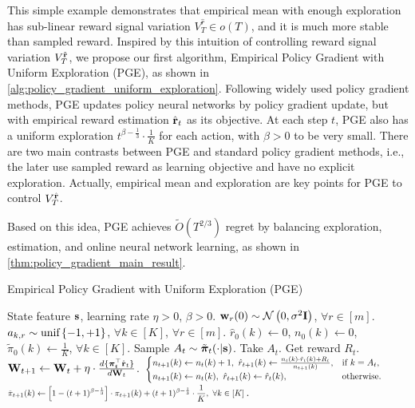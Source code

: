 This simple example demonstrates that empirical mean with enough exploration has sub-linear reward signal variation $V_T^{\hat{r}} \in o(T)$, and it is  much more stable than sampled reward. Inspired by this intuition of controlling reward signal variation $V_T^{\tilde{{\mathbf{r}}}}$, we propose our first algorithm, Empirical Policy Gradient with Uniform Exploration (PGE), as shown in \cref{alg:policy_gradient_uniform_exploration}. Following widely used policy gradient methods, PGE updates policy neural networks by policy gradient update, but with empirical reward estimation $\hat{{\mathbf{r}}}_t$ as its objective. At each step $t$, PGE also has a uniform exploration $t^{ \beta - \frac{1}{3}} \cdot \frac{1}{K}$ for each action, with $\beta > 0$ to be very small. There are two main contrasts between PGE and standard policy gradient methods, i.e., the later use sampled reward as learning objective and have no explicit exploration. Actually, empirical mean and exploration are key points for PGE to control $V_T^{\hat{{\mathbf{r}}}}$. 
 
Based on this idea, PGE achieves $\tilde{O}(T^{2/3})$ regret by balancing exploration, estimation, and online neural network learning, as shown in \cref{thm:policy_gradient_main_result}.

\begin{algorithm}[t]
\caption{Empirical Policy Gradient with Uniform Exploration (PGE)}
\label{alg:policy_gradient_uniform_exploration}
\begin{algorithmic}
    State feature ${\mathbf{s}}$, learning rate $\eta > 0$, $\beta > 0$.
   \STATE ${\mathbf{w}}_r(0) \sim {\mathcal{N}}\left( 0, \sigma^2 {\mathbf{I}} \right)$, $\forall r \in [m]$. $a_{k, r} \sim 
   {\text{unif}}\left\{-1, +1\right\}$, $\forall k \in [K]$, $\forall r \in [m]$.
   \STATE $\hat{r}_{0}(k) \gets 0$, $n_{0}(k) \gets 0$, $\tilde{\pi}_0(k) \gets \frac{1}{K}$, $\forall k \in [K]$.
   \STATE Sample $A_{t} \sim \tilde{{\boldsymbol{\pi}}}_{t}(\cdot | {\mathbf{s}} )$. Take $A_{t}$. Get reward $R_{t}$.
   \STATE ${\mathbf{W}}_{t+1} \leftarrow {\mathbf{W}}_t + \eta \cdot \frac{d \{ {\boldsymbol{\pi}}_t^\top \hat{{\mathbf{r}}}_t \} }{d {\mathbf{W}}_t}$.
   \STATE $\scalemath{0.8}{ \left. 
		\begin{cases}
		n_{t+1}(k) \gets  n_{t}(k) + 1, \ \hat{r}_{t+1}(k) \gets \frac{n_{t}(k) \cdot \hat{r}_{t}(k) + R_{t} }{n_{t+1}(k)},  & \text{if } k = A_t, \\
		n_{t+1}(k) \gets n_{t}(k), \ \hat{r}_{t+1}(k) \gets \hat{r}_{t}(k),  & \text{otherwise}.
		\end{cases}
		\right.}$ 
   \STATE $\scalemath{0.75}{ \tilde{\pi}_{t+1}(k) \gets \left[ 1 - (t+1)^{ \beta - \frac{1}{3} } \right] \cdot  \pi_{t+1}(k) + (t+1)^{ \beta - \frac{1}{3} }  \cdot \frac{1}{K}, \ \forall k \in [K] }$.
   \ENDFOR
\end{algorithmic}
\end{algorithm}

